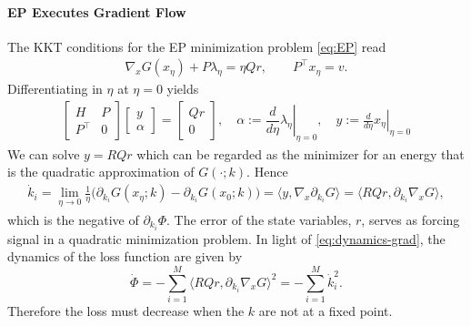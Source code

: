 \documentclass{siamart}
\begin{document}
\paragraph{EP Executes Gradient Flow}

The KKT conditions for the EP minimization problem \eqref{eq:EP} read
\begin{align}
\nabla_x G(x_\eta) + P\lambda_\eta = \eta Qr,\qquad P^\top x_\eta = v.\label{eq:kkt-eta-EP}
\end{align}
Differentiating in $\eta$ at $\eta=0$ yields
\begin{align}
\begin{bmatrix}
H & P\\
P^\top & 0
\end{bmatrix}
\begin{bmatrix}
y\\
\alpha
\end{bmatrix}
=
\begin{bmatrix}
Qr\\
0
\end{bmatrix}, \quad \alpha :=\left.\dfrac{d}{d\eta}\lambda_\eta\right|_{\eta=0} ,\quad
y := \left. \frac{d}{d\eta}x_\eta\right |_{\eta=0}\label{eq:psi}
\end{align}
We can solve $y = RQr$ which can be regarded as the minimizer for an energy that is the quadratic approximation of $G(\cdot; k)$. Hence
\begin{align}
\dot{k}_i=\lim_{\eta\to 0}\frac{1}{\eta}\Big(\partial_{k_i}G(x_\eta;k)-\partial_{k_i}G(x_0;k)\Big)
= \big\langle y, \nabla_x \partial_{k_i}G\big\rangle
= \big\langle R Qr,\partial_{k_i}\nabla_x G\big\rangle\label{eq:dynamics-EP},
\end{align}
which is the negative of $\partial_{k_i}\Phi$. The error of the state variables, $r$, serves as forcing signal in a quadratic minimization problem. In light of \eqref{eq:dynamics-grad}, the dynamics of the loss function are given by
\begin{equation}
    \dot{\Phi} = - \sum_{i=1}^M\big\langle R Q r,\partial_{k_i}\nabla_x G\big\rangle^2=- \sum_{i=1}^M\dot{k}_i^2.
\end{equation}
Therefore the loss must decrease when the $k$ are not at a fixed point.
\end{document}
